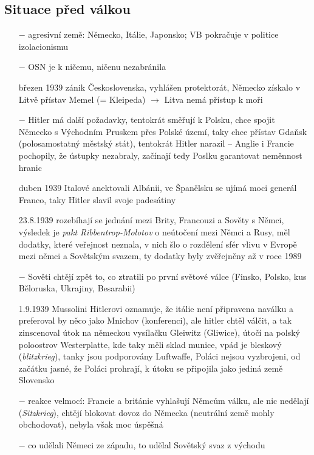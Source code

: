 \documentclass{article}
\begin{document}
\subsection*{Situace před válkou}
\begin{itemize}
    \vspace{-0.5em}
    \setlength\itemsep{0.15em}
    \item[$-$] agresivní země: Německo, Itálie, Japonsko; VB pokračuje v politice izolacionismu
    \item[$-$] OSN je k ničemu, ničenu nezabránila
    \item[březen 1939] zánik Československa, vyhlášen protektorát, Německo získalo v Litvě přístav Memel (= Kleipeda) $\rightarrow$ Litva nemá přístup k moři
    \item[$-$] Hitler má další požadavky, tentokrát směřují k Polsku, chce spojit Německo s Východním Pruskem přes Polské území, taky chce přístav Gdaňsk (polosamostatný městský stát), tentokrát Hitler narazil -- Anglie i Francie pochopily, že ústupky nezabraly, začínají tedy Poslku garantovat neměnnost hranic
    \item[duben 1939] Italové anektovali Albánii, ve Španělsku se ujímá moci generál Franco, taky Hitler slavil svoje padesátiny
    \item[23.8.1939] rozebíhají se jednání mezi Brity, Francouzi a Sověty s Němci, výsledek je \textit{pakt Ribbentrop-Molotov} o neútočení mezi Němci a Rusy, měl dodatky, které veřejnost neznala, v nich šlo o rozdělení sfér vlivu v Evropě mezi němci a Sovětským svazem, ty dodatky byly zvěřejněny až v roce 1989
    \item[$-$] Sověti chtějí zpět to, co ztratili po první světové válce (Finsko, Polsko, kus Běloruska, Ukrajiny, Besarabii)
    \item[1.9.1939] Mussolini Hitlerovi oznamuje, že itálie není připravena naválku a preferoval by něco jako Mnichov (konferenci), ale hitler chtěl válčit, a tak zinscenoval útok na německou vysílačku Gleiwitz (Gliwice), útočí na polský poloostrov Westerplatte, kde taky měli sklad munice, vpád je bleskový (\textit{blitzkrieg}), tanky jsou podporovány Luftwaffe, Poláci nejsou vyzbrojeni, od začátku jasné, že Poláci prohrají, k útoku se připojila jako jediná země Slovensko
    \item[$-$] reakce velmocí: Francie a británie vyhlašují Němcům válku, ale nic nedělají (\textit{Sitzkrieg}), chtějí blokovat dovoz do Německa (neutrální země mohly obchodovat), nebyla však moc úspěšná
    \item[$-$] co udělali Němeci ze západu, to udělal Sovětský svaz z východu

\end{itemize}
\end{document}
